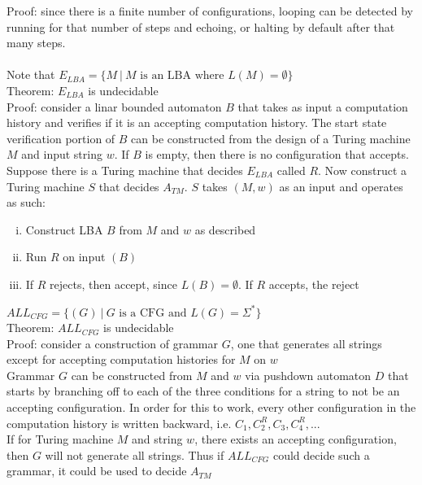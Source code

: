 \documentclass{article}
\newcommand*{\<}{\langle}
\renewcommand*{\>}{\rangle}
\begin{document}
			Proof: since there is a finite number of configurations, looping can be detected by running for that number of steps and echoing, or halting by default after that many steps. \\
			\\
			Note that $E_{LBA} = \{M\:|\:M\text{ is an LBA where }L(M) = \emptyset\}$ \\
			Theorem: $E_{LBA}$ is undecidable \\
			Proof: consider a linar bounded automaton $B$ that takes as input a computation history and verifies if it is an accepting computation history. The start state verification portion of $B$ can be constructed from the design of a Turing machine $M$ and input string $w$. If $B$ is empty, then there is no configuration that accepts. \\
			Suppose there is a Turing machine that decides $E_{LBA}$ called $R$. Now construct a Turing machine $S$ that decides $A_{TM}$. $S$ takes $(M, w)$ as an input and operates as such:
			\begin{enumerate}[(i)]
				\item Construct LBA $B$ from $M$ and $w$ as described
				\item Run $R$ on input $(B)$
				\item If $R$ rejects, then accept, since $L(B) = \emptyset$. If $R$ accepts, the reject
				\end{enumerate}
			$ALL_{CFG} = \{(G)\:|\:G\text{ is a CFG and }L(G) = \Sigma^*\}$ \\
			Theorem: $ALL_{CFG}$ is undecidable \\
			Proof: consider a construction of grammar $G$, one that generates all strings except for accepting computation histories for $M$ on $w$ \\
			Grammar $G$ can be constructed from $M$ and $w$ via pushdown automaton $D$ that starts by branching off to each of the three conditions for a string to not be an accepting configuration. In order for this to work, every other configuration in the computation history is written backward, i.e. $C_1, C_2^R, C_3, C_4^R, ...$ \\
			If for Turing machine $M$ and string $w$, there exists an accepting configuration, then $G$ will not generate all strings. Thus if $ALL_{CFG}$ could decide such a grammar, it could be used to decide $A_{TM}$
\end{document}
